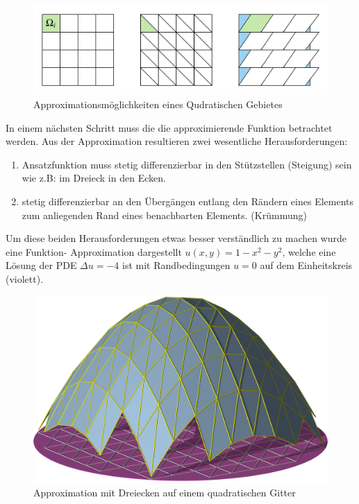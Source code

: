 \begin{figure}[h!]
	\centering
	\includegraphics[scale=0.6]{papers/fem/Images/Figuren.jpeg}
	\caption{Approximationsmöglichkeiten eines Qudratischen Gebietes}
	\label{fig:Figuren}
\end{figure}

In einem nächsten Schritt muss die die approximierende Funktion betrachtet werden. Aus der Approximation resultieren zwei wesentliche Herausforderungen:
\begin{enumerate}
	\item Ansatzfunktion muss stetig differenzierbar in den Stützstellen (Steigung) sein wie z.B: im Dreieck in den Ecken.
	\item stetig differenzierbar an den Übergängen entlang den Rändern eines Elements zum anliegenden Rand eines benachbarten Elements. (Krümmung)
\end{enumerate}
Um diese beiden Herausforderungen etwas besser verständlich zu machen wurde  eine Funktion- Approximation dargestellt  $u(x,y) = 1-x^2-y^2$, welche eine Lösung der PDE $\Delta u = -4$ ist mit Randbedingungen $u=0$ auf dem Einheitskreis (violett).
\begin{figure}[h]
	\centering
	\includegraphics[scale=0.8]{papers/fem/Images/ansatz.jpg}
	\caption{Approximation mit Dreiecken auf einem quadratischen Gitter }
	\label{fig:Ansatz}
\end{figure}
